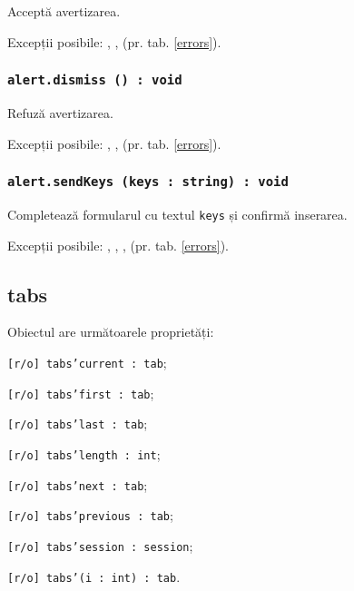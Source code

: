 Acceptă avertizarea.

Excepții posibile: , ,  (pr. tab. \ref{errors}).

\subsubsection{\texttt{alert.dismiss () : void}}

Refuză avertizarea.

Excepții posibile: , ,  (pr. tab. \ref{errors}).

\subsubsection{\texttt{alert.sendKeys (keys : string) : void}}

Completează formularul cu textul \texttt{keys} și confirmă inserarea.

Excepții posibile: , , ,  (pr. tab. \ref{errors}).

\subsection{{\color{orange} tabs}}

Obiectul \tabs{} are următoarele proprietăți:
\begin{icItems}
	\item \texttt{[r/o] tabs'current : tab};
	\item \texttt{[r/o] tabs'first : tab};
	\item \texttt{[r/o] tabs'last : tab};
	\item \texttt{[r/o] tabs'length : int};
	\item \texttt{[r/o] tabs'next : tab};
	\item \texttt{[r/o] tabs'previous : tab};
	\item \texttt{[r/o] tabs'session : session};
	\item \texttt{[r/o] tabs'(i : int) : tab}.
\end{icItems}

